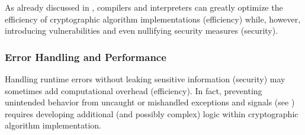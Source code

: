 As already discussed in , compilers and interpreters can greatly optimize the efficiency of cryptographic algorithm implementations (efficiency) while, however, introducing vulnerabilities and even nullifying security measures \cite{schneider_breaking_2024} (security).


\subsubsection{Error Handling and Performance}\label{sec:security_of_cryptographic_algorithms:trade_offs:error_handling_and_performance}

Handling runtime errors without leaking sensitive information (security) may sometimes add computational overhead (efficiency). In fact, preventing unintended behavior from uncaught or mishandled exceptions and signals (see ) requires developing additional (and possibly complex) logic within cryptographic algorithm implementation.










